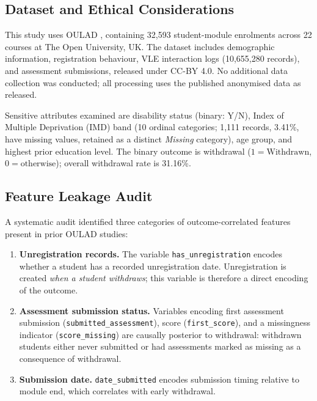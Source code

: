 \documentclass[12pt,a4paper]{article}
\begin{document}
\subsection{Dataset and Ethical Considerations}

This study uses OULAD \citep{kuzilek2017}, containing 32,593 student-module
enrolments across 22 courses at The Open University, UK. The dataset includes
demographic information, registration behaviour, VLE interaction logs
(10,655,280 records), and assessment submissions, released under CC-BY 4.0.
No additional data collection was conducted; all processing uses the published
anonymised data as released.

Sensitive attributes examined are disability status (binary: Y/N), Index of
Multiple Deprivation (IMD) band (10 ordinal categories; 1,111 records,
3.41\%, have missing values, retained as a distinct \textit{Missing}
category), age group, and highest prior education level. The binary outcome is
withdrawal ($1 = \text{Withdrawn}$, $0 = \text{otherwise}$); overall
withdrawal rate is 31.16\%.

\subsection{Feature Leakage Audit}
\label{sec:leakage}

A systematic audit identified three categories of outcome-correlated features
present in prior OULAD studies:

\begin{enumerate}[leftmargin=*, label=(\arabic*)]
  \item \textbf{Unregistration records.} The variable
  \texttt{has\_unregistration} encodes whether a student has a recorded
  unregistration date. Unregistration is created \textit{when a student
  withdraws}; this variable is therefore a direct encoding of the outcome.

  \item \textbf{Assessment submission status.} Variables encoding first
  assessment submission (\texttt{submitted\_assessment}), score
  (\texttt{first\_score}), and a missingness indicator
  (\texttt{score\_missing}) are causally posterior to withdrawal: withdrawn
  students either never submitted or had assessments marked as missing as a
  consequence of withdrawal.

  \item \textbf{Submission date.} \texttt{date\_submitted} encodes submission
  timing relative to module end, which correlates with early withdrawal.
\end{enumerate}
\end{document}
